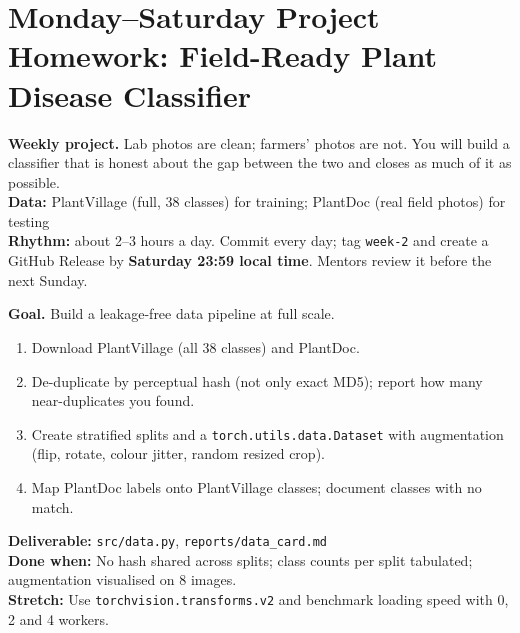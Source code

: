 \clearpage
\section*{Monday--Saturday Project Homework: Field-Ready Plant Disease Classifier}
\begin{tcolorbox}[enhanced,colback=navy,colframe=gold,boxrule=0.8pt,arc=3pt,coltext=white,left=8pt,right=8pt,top=6pt,bottom=6pt]
{\color{gold}\bfseries Weekly project.} Lab photos are clean; farmers' photos are not. You will build a classifier that is honest about the gap between the two and closes as much of it as possible.\\[3pt]
{\color{gold}\bfseries Data:} PlantVillage (full, 38 classes) for training; PlantDoc (real field photos) for testing\\[3pt]
{\color{gold}\bfseries Rhythm:} about 2--3 hours a day. Commit every day; tag \texttt{week-2} and create a GitHub Release by \textbf{Saturday 23:59 local time}. Mentors review it before the next Sunday.
\end{tcolorbox}

\begin{tcolorbox}[enhanced,breakable,colback=white,colframe=sun,boxrule=0.8pt,arc=2pt,left=7pt,right=7pt,top=4pt,bottom=4pt,
  title={\bfseries Monday --- A 38-class image pipeline\hfill\normalfont\small 3 h},coltitle=white,colbacktitle=sun,fonttitle=\small]
\textbf{Goal.} Build a leakage-free data pipeline at full scale.
\begin{enumerate}[itemsep=1pt,topsep=2pt]
  \item Download PlantVillage (all 38 classes) and PlantDoc.
  \item De-duplicate by perceptual hash (not only exact MD5); report how many near-duplicates you found.
  \item Create stratified splits and a \texttt{torch.utils.data.Dataset} with augmentation (flip, rotate, colour jitter, random resized crop).
  \item Map PlantDoc labels onto PlantVillage classes; document classes with no match.
\end{enumerate}
\textbf{\color{dataC}Deliverable:} \texttt{src/data.py}, \texttt{reports/data\_card.md}\\
\textbf{\color{navy}Done when:} No hash shared across splits; class counts per split tabulated; augmentation visualised on 8 images.\\
\textbf{\color{skillC}Stretch:} Use \texttt{torchvision.transforms.v2} and benchmark loading speed with 0, 2 and 4 workers.
\end{tcolorbox}

